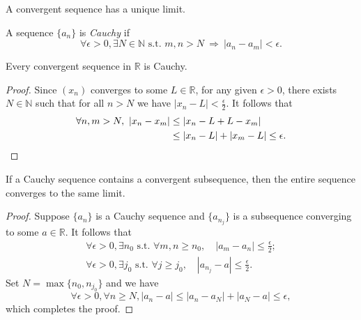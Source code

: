 
\begin{lem}
  \label{lem:seqLimitIsUnique}
  A convergent sequence has a unique limit.
\end{lem}

\begin{defn}
  \label{def:CauchySequence}
  A sequence $\{a_n\}$ is \emph{Cauchy} if
  \begin{equation}
    \label{eq:CauchySequence}
    \forall \epsilon>0, \exists N\in \mathbb{N}
    \text{ s.t. } m,n>N\ \Rightarrow\ |a_n-a_m| < \epsilon.
  \end{equation}
\end{defn}

\begin{lem}
  \label{lem:convergentSeqIsCauchy}
  Every convergent sequence in $\mathbb{R}$
  is Cauchy.
\end{lem}
\begin{proof}
  Since $(x_n)$ converges to some $L\in \mathbb{R}$,
  for any given $\epsilon>0$,
  there exists $N\in \mathbb{N}$ such that
  for all $n>N$ we have $|x_n-L|<\frac{\epsilon}{2}$.
  It follows that
  \begin{align*}
    \forall n,m>N,\  |x_n-x_m|
    &\le |x_n-L+L-x_m|
    \\
    &\le |x_n-L| + |x_m-L| \le \epsilon.\qedhere
  \end{align*}
\end{proof}

\begin{lem}
  \label{lem:CauchySubseqConvergence}
  If a Cauchy sequence contains a convergent subsequence,
  then the entire sequence converges to the same limit.
\end{lem}
\begin{proof}
  Suppose $\{a_n\}$ is a Cauchy sequence
  and $\{a_{n_j}\}$ is a subsequence converging to some $a\in \mathbb{R}$.
  It follows that
  \begin{displaymath}
    \begin{array}{l}
    \forall \epsilon>0, \exists n_0 \text{ s.t. }
    \forall m,n\ge n_0,\quad |a_m-a_n|\le \frac{\epsilon}{2};
    \\
    \forall \epsilon>0, \exists j_0 \text{ s.t. }
    \forall j\ge j_0,\quad |a_{n_j}-a|\le \frac{\epsilon}{2}.
    \end{array}
  \end{displaymath}
  Set $N=\max\{n_0, n_{j_0}\}$ and we have
  \begin{displaymath}
    \forall \epsilon>0, \forall n\ge N, 
    |a_{n}-a|\le |a_{n}-a_N|+ |a_{N}-a|
    \le \epsilon,
  \end{displaymath}
  which completes the proof.
\end{proof}

